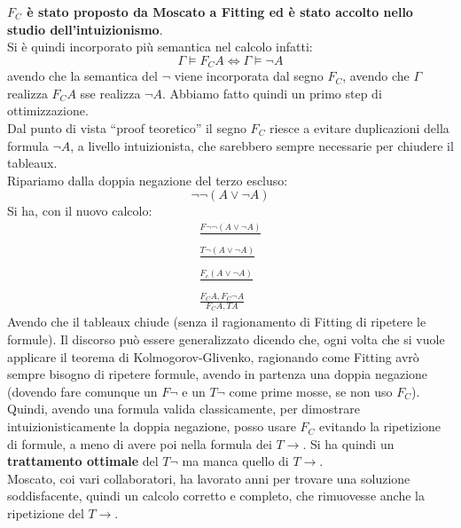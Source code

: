 \documentclass[a4paper,12pt, oneside]{book}
\begin{document}
\textbf{$F_C$ è stato proposto da Moscato a Fitting ed è stato accolto nello
  studio dell'intuizionismo}.\\
Si è quindi incorporato più semantica nel calcolo infatti:
\[\Gamma\vDash F_CA \iff \Gamma\vDash \neg A\]
avendo che la semantica del $\neg$ viene incorporata dal segno $F_C$, avendo che
$\Gamma$ realizza $F_C A$ sse realizza $\neg A$. Abbiamo fatto quindi un primo
step di ottimizzazione.\\
Dal punto di vista ``proof teoretico'' il segno $F_C$ riesce a evitare
duplicazioni della formula $\neg A$, a livello intuizionista, che sarebbero
sempre necessarie per chiudere il tableaux.\\
Ripariamo dalla doppia negazione del terzo escluso:
\[\neg\neg(A\lor \neg A)\]
Si ha, con il nuovo calcolo:
\begin{gather*}
  \frac{F\neg\neg(A\lor \neg A)}{}\\
  \frac{T\neg (A\lor \neg A)}{}\\
  \frac{F_c(A\lor\neg A)}{}\\
  \frac{F_C A, F_C\neg A}{F_C A, TA}
\end{gather*}
Avendo che il tableaux chiude (senza il ragionamento di Fitting di ripetere le
formule).
Il discorso può essere generalizzato dicendo che, ogni volta che si vuole
applicare il teorema di Kolmogorov-Glivenko, ragionando come Fitting avrò sempre
bisogno di ripetere formule, avendo in partenza una doppia negazione (dovendo
fare comunque un $F\neg$ e un $T\neg$ come prime mosse, se non uso
$F_C$). Quindi, avendo una formula valida classicamente, per dimostrare
intuizionisticamente la doppia negazione, posso usare $F_C$ evitando la
ripetizione di formule, a meno di avere poi nella formula dei $T\to$. Si ha
quindi un \textbf{trattamento ottimale} del $T\neg$ ma manca quello di
$T\to$. \\
Moscato, coi vari collaboratori, ha lavorato anni per trovare una
soluzione soddisfacente, quindi un calcolo corretto e completo, che rimuovesse
anche la ripetizione del $T\to$.
\end{document}
